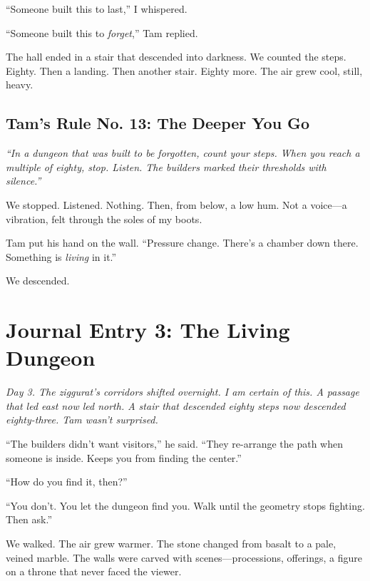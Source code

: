 \documentclass[11pt]{article}
\begin{document}
``Someone built this to last,'' I whispered.

``Someone built this to \textit{forget},'' Tam replied.

The hall ended in a stair that descended into darkness. We counted the steps. Eighty. Then a landing. Then another stair. Eighty more. The air grew cool, still, heavy.

\subsection*{Tam's Rule No. 13: The Deeper You Go}
\textit{``In a dungeon that was built to be forgotten, count your steps. When you reach a multiple of eighty, stop. Listen. The builders marked their thresholds with silence.''}

We stopped. Listened. Nothing. Then, from below, a low hum. Not a voice---a vibration, felt through the soles of my boots.

Tam put his hand on the wall. ``Pressure change. There's a chamber down there. Something is \textit{living} in it.''

We descended.

\section*{Journal Entry 3: The Living Dungeon}
\textit{Day 3. The ziggurat's corridors shifted overnight. I am certain of this. A passage that led east now led north. A stair that descended eighty steps now descended eighty-three. Tam wasn't surprised.}

``The builders didn't want visitors,'' he said. ``They re-arrange the path when someone is inside. Keeps you from finding the center.''

``How do you find it, then?''

``You don't. You let the dungeon find you. Walk until the geometry stops fighting. Then ask.''

We walked. The air grew warmer. The stone changed from basalt to a pale, veined marble. The walls were carved with scenes---processions, offerings, a figure on a throne that never faced the viewer.
\end{document}
